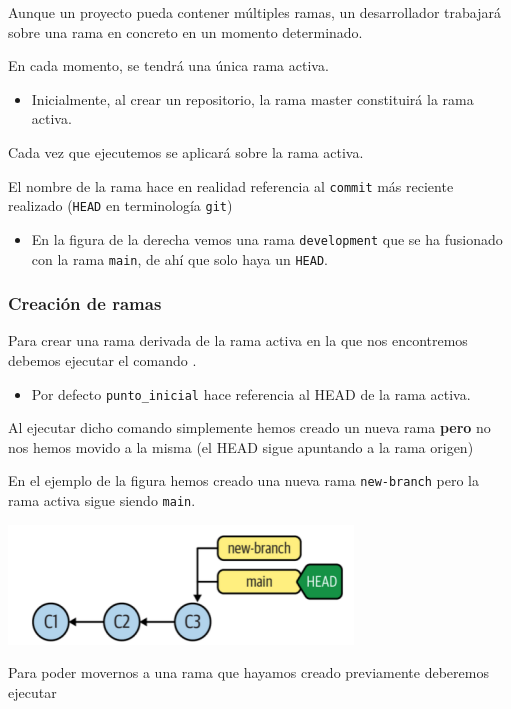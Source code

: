 Aunque un proyecto pueda contener múltiples ramas, un desarrollador trabajará sobre una rama en concreto en un momento determinado.

En cada momento, se tendrá una única rama activa.

\begin{itemize}
	\item Inicialmente, al crear un repositorio, la rama master constituirá la rama activa.
\end{itemize}
Cada vez que ejecutemos  se aplicará sobre la rama activa.

El nombre de la rama hace en realidad referencia al \texttt{commit} más reciente realizado (\texttt{HEAD} en terminología \texttt{git})
\begin{itemize}
	\item En la figura de la derecha vemos una rama \texttt{development} que se ha fusionado con la rama \texttt{main}, de ahí que solo haya un \texttt{HEAD}.
\end{itemize}
\subsubsection*{\hspace{10pt}Creación de ramas}
Para crear una rama derivada de la rama activa en la que nos encontremos
debemos ejecutar el comando .
\begin{itemize}
	\item Por defecto \texttt{punto_inicial} hace referencia al HEAD de la rama activa.
\end{itemize}
Al ejecutar dicho comando simplemente hemos creado un nueva rama \textbf{pero} no nos hemos movido a la misma (el HEAD sigue apuntando a la rama origen)

En el ejemplo de la figura hemos creado una nueva rama \texttt{new-branch} pero la rama activa sigue siendo \texttt{main}.
\begin{center}
	\includegraphics{"Temas/Tema 1/screenshot011"}
\end{center}
Para poder movernos a una rama que hayamos creado previamente deberemos ejecutar \linebreak {}

